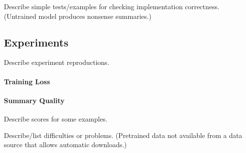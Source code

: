 Describe simple tests/examples for checking implementation correctness. (Untrained model produces nonsense summaries.)

\subsection{Experiments}

Describe experiment reproductions.

\paragraph{Training Loss}




\paragraph{Summary Quality}

Describe \Rouge scores for some examples.

Describe/list difficulties or problems. (Pretrained data not available from a data source that allows automatic downloads.)

